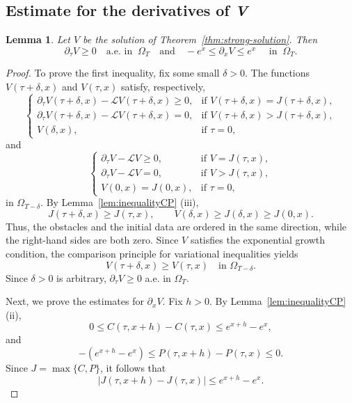 \documentclass[11pt, a4paper, leqno]{amsart}
\numberwithin{equation}{section}
\theoremstyle{plain}
\newtheorem{lemma}[theorem]{Lemma}
\theoremstyle{definition}
\theoremstyle{remark}
\def\leq{\leqslant}
\def\geq{\geqslant}
\begin{document}
{
\subsection{Estimate for the derivatives of \textit{V}}

\begin{lemma}\label{DV}
{Let $V$ be the solution of Theorem~\ref{thm:strong-solution}.} Then
\[
    \partial_\tau V\geq0
    \quad \text{a.e. in }\ \Omega_T
    \quad\text{and}\quad
    -e^x\leq\partial_xV\leq e^x
    \quad\text{ in }\ \Omega_T.
\]
\end{lemma}

\begin{proof}
To prove the first inequality, fix some small $\delta>0$.
The functions $V(\tau+\delta,x)$ and $V(\tau,x)$ satisfy, respectively,
\[
\begin{cases}
\partial_\tau V(\tau+\delta,x)-\mathcal LV(\tau+\delta,x)\geq0,
&\text{if }V(\tau+\delta,x)=J(\tau+\delta,x),\\
\partial_\tau V(\tau+\delta,x)-\mathcal LV(\tau+\delta,x)=0,
&\text{if }V(\tau+\delta,x)>J(\tau+\delta,x),\\
V(\delta,x),&\text{if }\tau=0,
\end{cases}
\]
and
\[
\begin{cases}
\partial_\tau V-\mathcal LV\geq0,
&\text{if }V=J(\tau,x),\\
\partial_\tau V-\mathcal LV=0,
&\text{if }V>J(\tau,x),\\
V(0,x)=J(0,x),&\text{if }\tau=0,
\end{cases}
\]
in $\Omega_{T-\delta}$.
By Lemma~\ref{lem:inequalityCP} (iii),
\[
    J(\tau+\delta,x)\geq J(\tau,x),
    \qquad
    V(\delta,x)\geq J(\delta,x)\geq J(0,x).
\]
Thus, the obstacles and the initial data are ordered in the same
direction, while the right-hand sides are both zero.
Since $V$ satisfies the exponential growth condition, the comparison principle for variational inequalities \cite[Theorem 1.2]{YY08} yields
\[
    V(\tau+\delta,x)\geq V(\tau,x)
    \quad\text{in }\Omega_{T-\delta}.
\]
Since $\delta>0$ is arbitrary,
$\partial_\tau V\geq0$ a.e. in $\Omega_T$.

Next, we prove the estimates for $\partial_xV$.
Fix $h>0$. By Lemma~\ref{lem:inequalityCP} (ii),
\[
    0\leq C(\tau,x+h)-C(\tau,x)\leq e^{x+h}-e^x,
\]
and
\[
    -(e^{x+h}-e^x)
    \leq P(\tau,x+h)-P(\tau,x)\leq0.
\]
Since $J=\max\{C,P\}$, it follows that
\begin{equation}\label{J_difference}
    |J(\tau,x+h)-J(\tau,x)|
    \leq e^{x+h}-e^x.
\end{equation}


\end{proof}}
\end{document}
